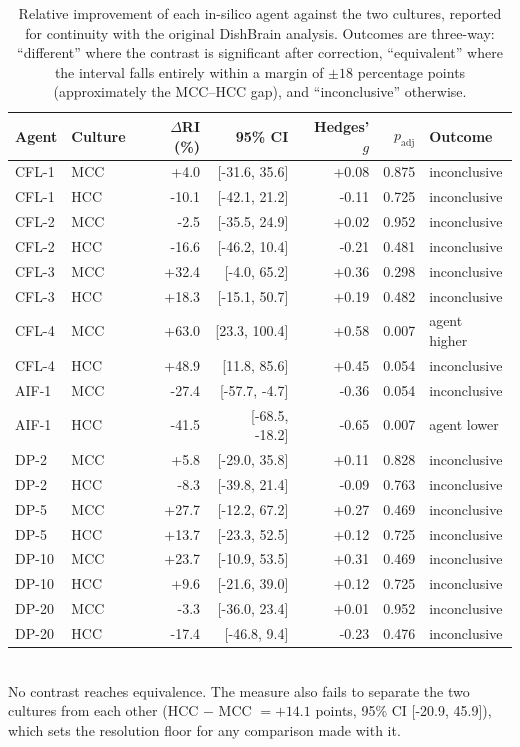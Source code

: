 \begin{table}[ht]
\centering
\small
\caption{Relative improvement of each in-silico agent against the two cultures, reported for continuity with the original DishBrain analysis. Outcomes are three-way: ``different'' where the contrast is significant after correction, ``equivalent'' where the interval falls entirely within a margin of $\pm18$ percentage points (approximately the MCC--HCC gap), and ``inconclusive'' otherwise.}
\label{tab:contrastsri}
\begin{tabular}{llrrrrl}
\toprule
Agent & Culture & $\Delta$RI (\%) & 95\% CI & Hedges' $g$ & $p_{\mathrm{adj}}$ & Outcome \\
\midrule
CFL-1 & MCC & +4.0 & [-31.6, 35.6] & +0.08 & 0.875 & inconclusive \\
CFL-1 & HCC & -10.1 & [-42.1, 21.2] & -0.11 & 0.725 & inconclusive \\
CFL-2 & MCC & -2.5 & [-35.5, 24.9] & +0.02 & 0.952 & inconclusive \\
CFL-2 & HCC & -16.6 & [-46.2, 10.4] & -0.21 & 0.481 & inconclusive \\
CFL-3 & MCC & +32.4 & [-4.0, 65.2] & +0.36 & 0.298 & inconclusive \\
CFL-3 & HCC & +18.3 & [-15.1, 50.7] & +0.19 & 0.482 & inconclusive \\
CFL-4 & MCC & +63.0 & [23.3, 100.4] & +0.58 & 0.007 & agent higher \\
CFL-4 & HCC & +48.9 & [11.8, 85.6] & +0.45 & 0.054 & inconclusive \\
AIF-1 & MCC & -27.4 & [-57.7, -4.7] & -0.36 & 0.054 & inconclusive \\
AIF-1 & HCC & -41.5 & [-68.5, -18.2] & -0.65 & 0.007 & agent lower \\
DP-2 & MCC & +5.8 & [-29.0, 35.8] & +0.11 & 0.828 & inconclusive \\
DP-2 & HCC & -8.3 & [-39.8, 21.4] & -0.09 & 0.763 & inconclusive \\
DP-5 & MCC & +27.7 & [-12.2, 67.2] & +0.27 & 0.469 & inconclusive \\
DP-5 & HCC & +13.7 & [-23.3, 52.5] & +0.12 & 0.725 & inconclusive \\
DP-10 & MCC & +23.7 & [-10.9, 53.5] & +0.31 & 0.469 & inconclusive \\
DP-10 & HCC & +9.6 & [-21.6, 39.0] & +0.12 & 0.725 & inconclusive \\
DP-20 & MCC & -3.3 & [-36.0, 23.4] & +0.01 & 0.952 & inconclusive \\
DP-20 & HCC & -17.4 & [-46.8, 9.4] & -0.23 & 0.476 & inconclusive \\
\bottomrule
\end{tabular}
\\[4pt]\footnotesize{No contrast reaches equivalence. The measure also fails to separate the two cultures from each other (HCC $-$ MCC $= +14.1$ points, 95\% CI [-20.9, 45.9]), which sets the resolution floor for any comparison made with it.}
\end{table}
